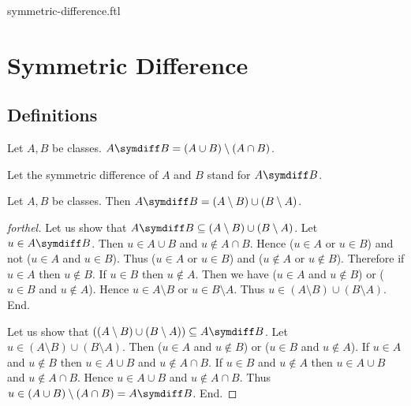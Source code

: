 \documentclass{naproche-library}
\begin{document}
\begin{smodule}{symmetric-difference.ftl}


  \section*{Symmetric Difference}

  \subsection*{Definitions}

  \begin{definition}[forthel,id=FOUNDATIONS_03_7457594151010304]
    Let $A, B$ be classes.
    $A \symdiff B = (A \cup B) \setminus (A \cap B)$.

    Let the symmetric difference of $A$ and $B$ stand for $A \symdiff B$.
  \end{definition}

  \begin{proposition}[forthel,id=FOUNDATIONS_03_4886447211413504]
    Let $A, B$ be classes.
    Then $A \symdiff B = (A \setminus B) \cup (B \setminus A)$.
  \end{proposition}
  \begin{proof}[forthel]
    Let us show that $A \symdiff B \subseteq (A \setminus B) \cup (B \setminus A)$.
      Let $u \in A \symdiff B$.
      Then $u \in A \cup B$ and $u \notin A \cap B$.
      Hence ($u \in A$ or $u \in B$) and not ($u \in A$ and $u \in B$).
      Thus ($u \in A$ or $u \in B$) and ($u \notin A$ or $u \notin B$).
      Therefore if $u \in A$ then $u \notin B$.
      If $u \in B$ then $u \notin A$.
      Then we have ($u \in A$ and $u \notin B$) or ($u \in B$ and $u \notin A$).
      Hence $u \in A \setminus B$ or $u \in B \setminus A$.
      Thus $u \in (A \setminus B) \cup (B \setminus A)$.
    End.

    Let us show that $((A \setminus B) \cup (B \setminus A)) \subseteq A \symdiff B$. %
      Let $u \in (A \setminus B) \cup (B \setminus A)$.
      Then ($u \in A$ and $u \notin B$) or ($u \in B$ and $u \notin A$).
      If $u \in A$ and $u \notin B$ then $u \in A \cup B$ and $u \notin A \cap B$.
      If $u \in B$ and $u \notin A$ then $u \in A \cup B$ and $u \notin A \cap B$.
      Hence $u \in A \cup B$ and $u \notin A \cap B$.
      Thus $u \in (A \cup B) \setminus (A \cap B) = A \symdiff B$.
    End.
  \end{proof}



\end{smodule}
\end{document}
